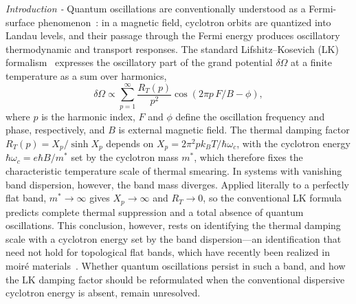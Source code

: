 \documentclass[prl,twocolumn,superscriptaddress,float,aps]{revtex4-2}
\newcommand{\kB}{k_{\!B}}
\begin{document}
{\it Introduction - }
Quantum oscillations are conventionally understood as a Fermi-surface phenomenon~\cite{shoenberg1984magnetic}: in a magnetic field, cyclotron orbits are quantized into Landau levels, and their passage through the Fermi energy produces oscillatory thermodynamic and transport responses. 
The standard Lifshitz--Kosevich (LK) formalism~\cite{lifshitz1956theory,shoenberg1984magnetic} expresses
the oscillatory part of the grand potential $\delta \Omega$ at a finite temperature as a sum over harmonics,
\begin{equation}
	\delta \Omega \propto \sum_{p=1}^{\infty}
	\frac{R_T(p)}{p^{2}}
	\cos (2\pi p\,F/B - \phi),
	\label{eq:lk-standard}
\end{equation}
where $p$ is the harmonic index, $F$ and $\phi$ define the oscillation frequency and phase, respectively, and $B$ is external magnetic field. The thermal damping factor $R_T(p) = X_p/\sinh X_p$ depends on
$X_p = 2\pi^{2} p \kB T / \hbar\omega_{c}$, with the cyclotron energy
$\hbar\omega_{c} = e\hbar B / m^{*}$ set by the cyclotron mass $m^{*}$, which
therefore fixes the characteristic temperature scale of thermal smearing. In
systems with vanishing band dispersion, however, the band mass diverges.
Applied literally to a perfectly flat band, $m^{*}\!\to\!\infty$ gives
$X_p\!\to\!\infty$ and $R_T\!\to\!0$, so the conventional LK formula predicts
complete thermal suppression and a total absence of quantum oscillations. This conclusion, however, rests on identifying the thermal damping scale with a
cyclotron energy set by the band dispersion---an identification that need not hold
for topological flat bands, which have recently been realized in moir\'e materials~\cite{bistritzer2011moire,cao2018unconventional,serlin2020intrinsic,song2022magic,ledwith2020fractional,cai2023signatures,zeng2023thermodynamic,xu2023observation,adak2024tunable,mak2022semiconductor,balents2020superconductivity,liu2021orbital,checkelsky2024flat,torma2022superconductivity,song2019all,song2021twisted,po2019faithful,ahn2019failure}. Whether quantum oscillations persist in such a band,
and how the LK damping factor should be reformulated when the conventional dispersive cyclotron energy is absent, remain unresolved.
\end{document}
